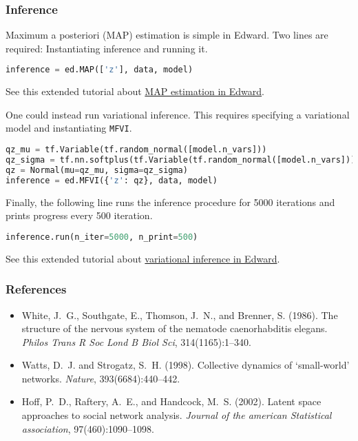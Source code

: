 \subsubsection{Inference}

Maximum a posteriori (MAP) estimation is simple in Edward. Two lines are
required: Instantiating inference and running it.
\begin{lstlisting}[language=Python]
inference = ed.MAP(['z'], data, model)
\end{lstlisting}

See this extended tutorial about
\href{tut_MAP.html}{MAP estimation in Edward}.

One could instead run variational inference. This requires specifying
a variational model and instantiating \texttt{MFVI}.
\begin{lstlisting}[language=Python]
qz_mu = tf.Variable(tf.random_normal([model.n_vars]))
qz_sigma = tf.nn.softplus(tf.Variable(tf.random_normal([model.n_vars])))
qz = Normal(mu=qz_mu, sigma=qz_sigma)
inference = ed.MFVI({'z': qz}, data, model)
\end{lstlisting}
Finally, the following line runs the inference procedure for 5000
iterations and prints progress every 500 iteration.
\begin{lstlisting}[language=Python]
inference.run(n_iter=5000, n_print=500)
\end{lstlisting}
See this extended tutorial about
\href{tut_variational_inference.html}{variational inference in Edward}.

\subsubsection{References}

\begin{itemize}
\item
White, J.~G., Southgate, E., Thomson, J.~N., and Brenner, S. (1986).
\newblock The structure of the nervous system of the nematode caenorhabditis
  elegans.
\newblock \emph{Philos Trans R Soc Lond B Biol Sci}, 314(1165):1--340.
\item
Watts, D.~J. and Strogatz, S.~H. (1998).
\newblock Collective dynamics of ‘small-world’ networks.
\newblock \emph{Nature}, 393(6684):440--442.
\item
Hoff, P.~D., Raftery, A.~E., and Handcock, M.~S. (2002).
\newblock Latent space approaches to social network analysis.
\newblock \emph{Journal of the american Statistical association},
  97(460):1090--1098.
\end{itemize}
